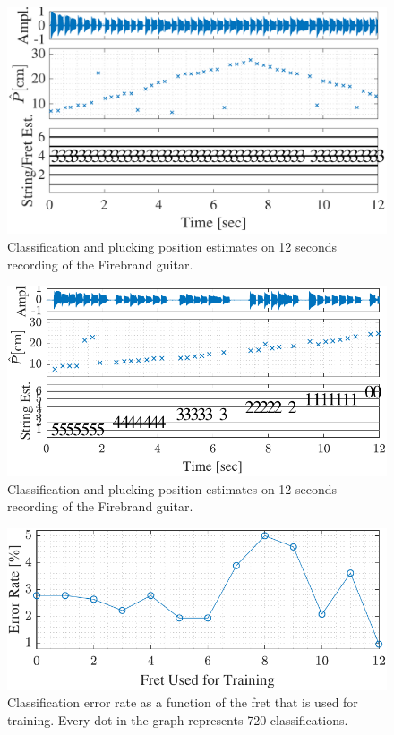 \documentclass{article}
\begin{document}
%
\begin{figure}[t]
  \centering
  \centerline{\includegraphics[width=.9\columnwidth]{img/tablature_constant_note8}}\vspace{-2mm}
  \caption{Classification and plucking position estimates on 12 seconds recording of the Firebrand guitar.}\label{fig:pluck_position_fixed_tabs}
\end{figure}%
%
\begin{figure}[t]
  \centering
  \centerline{\includegraphics[width=.92\columnwidth]{img/tablature_constant_note23_LSD}}%
  \caption{Classification and plucking position estimates on 12 seconds recording of the Firebrand guitar.}\label{fig:pluck_position_varied_tabs}\vspace{-.6mm}
\end{figure} \vspace{-.8mm}
%
\begin{figure}[htbp]
  \centering %
  \centerline{\includegraphics[width=.9\columnwidth]{img/errorRate_vs_frets}}%
  \caption{Classification error rate as a function of the fret that is used for training. Every  dot in the graph represents 720 classifications.}\label{fig:err_vs_frets}
\end{figure}%
\end{document}
